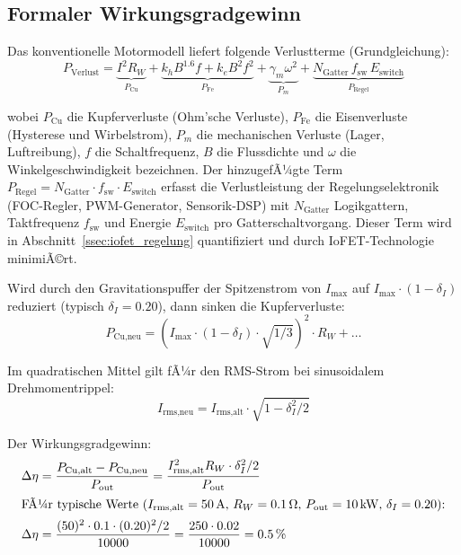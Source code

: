 ﻿\documentclass[12pt, a4paper]{report}
\theoremstyle{definition}
\theoremstyle{remark}
\begin{document}
\subsection{Formaler Wirkungsgradgewinn}

Das konventionelle Motormodell liefert folgende Verlustterme (Grundgleichung):
\begin{equation}
  P_{\text{Verlust}} = \underbrace{I^2 R_W}_{P_{\text{Cu}}}
                     + \underbrace{k_h B^{1.6} f + k_e B^2 f^2}_{P_{\text{Fe}}}
                     + \underbrace{\gamma_m \omega^2}_{P_m}
                     + \underbrace{N_\text{Gatter}\,f_\text{sw}\,E_\text{switch}}_{P_{\text{Regel}}}
  \label{eq:verluste_ges}
\end{equation}

wobei $P_{\text{Cu}}$ die Kupferverluste (Ohm'sche Verluste), $P_{\text{Fe}}$
die Eisenverluste (Hysterese und Wirbelstrom), $P_m$ die mechanischen Verluste
(Lager, Luftreibung), $f$ die Schaltfrequenz, $B$ die Flussdichte und $\omega$ die
Winkelgeschwindigkeit bezeichnen. Der hinzugefÃ¼gte Term
$P_{\text{Regel}} = N_\text{Gatter} \cdot f_\text{sw} \cdot E_\text{switch}$
erfasst die Verlustleistung der Regelungselektronik (FOC-Regler, PWM-Generator,
Sensorik-DSP) mit $N_\text{Gatter}$ Logikgattern, Taktfrequenz $f_\text{sw}$
und Energie $E_\text{switch}$ pro Gatterschaltvorgang. Dieser Term wird in
Abschnitt~\ref{ssec:iofet_regelung} quantifiziert und durch IoFET-Technologie
minimiÃ©rt.

Wird durch den Gravitationspuffer der Spitzenstrom von $I_{\max}$ auf
$I_{\max} \cdot (1 - \delta_I)$ reduziert (typisch $\delta_I = 0.20$), dann sinken
die Kupferverluste:
\begin{equation}
  P_{\text{Cu,neu}} = (I_{\max}\cdot(1-\delta_I)\cdot\sqrt{1/3})^2 \cdot R_W + \ldots
\end{equation}

Im quadratischen Mittel gilt fÃ¼r den RMS-Strom bei sinusoidalem Drehmomentrippel:
\begin{equation}
  I_{\text{rms,neu}} = I_{\text{rms,alt}} \cdot \sqrt{1 - \delta_I^2/2}
  \label{eq:I_rms_neu}
\end{equation}

Der Wirkungsgradgewinn:
\begin{align}
  \Delta\eta &= \frac{P_{\text{Cu,alt}} - P_{\text{Cu,neu}}}{P_{\text{out}}}
  = \frac{I_{\text{rms,alt}}^2 R_W \cdot \delta_I^2/2}{P_{\text{out}}}
  \label{eq:delta_eta} \\
  \intertext{FÃ¼r typische Werte ($I_{\text{rms,alt}} = \SI{50}{\ampere}$,
  $R_W = \SI{0.1}{\ohm}$, $P_{\text{out}} = \SI{10}{\kilo\watt}$,
  $\delta_I = 0.20$):}
  \Delta\eta &= \frac{(50)^2 \cdot 0.1 \cdot (0.20)^2/2}{10000}
  = \frac{250 \cdot 0.02}{10000} = 0.5\,\%
  \label{eq:delta_eta_num}
\end{align}
\end{document}
